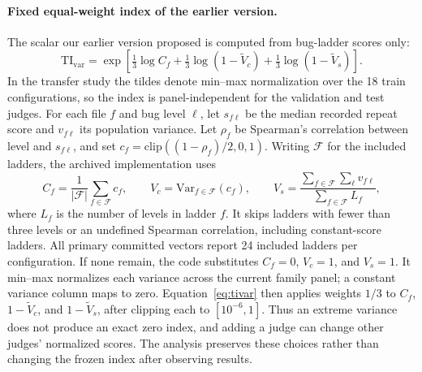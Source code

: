 \paragraph{Fixed equal-weight index of the earlier version.}
The scalar our earlier version proposed is computed from bug-ladder scores only:
\begin{equation}
\mathrm{TI}_{\mathrm{var}}=\exp\!\left[\tfrac13\log C_f+\tfrac13\log(1-\widetilde V_c)+\tfrac13\log(1-\widetilde V_s)\right].
\label{eq:tivar}
\end{equation}
In the transfer study the tildes denote min--max normalization over the 18 train configurations, so the index is panel-independent for the validation and test judges.
For each file $f$ and bug level $\ell$, let $s_{f\ell}$ be the median recorded repeat score and $v_{f\ell}$ its population variance.
Let $\rho_f$ be Spearman's correlation between level and $s_{f\ell}$, and set $c_f=\mathrm{clip}((1-\rho_f)/2,0,1)$.
Writing $\mathcal F$ for the included ladders, the archived implementation uses
\[
 C_f=\frac1{|\mathcal F|}\sum_{f\in\mathcal F}c_f,\qquad
 V_c=\mathrm{Var}_{f\in\mathcal F}(c_f),\qquad
 V_s=\frac{\sum_{f\in\mathcal F}\sum_\ell v_{f\ell}}{\sum_{f\in\mathcal F}L_f},
\]
where $L_f$ is the number of levels in ladder $f$.
It skips ladders with fewer than three levels or an undefined Spearman correlation, including constant-score ladders.
All primary committed vectors report 24 included ladders per configuration.
If none remain, the code substitutes $C_f=0$, $V_c=1$, and $V_s=1$.
It min--max normalizes each variance across the current family panel; a constant variance column maps to zero.
Equation~\ref{eq:tivar} then applies weights $1/3$ to $C_f$, $1-\widetilde V_c$, and $1-\widetilde V_s$, after clipping each to $[10^{-6},1]$.
Thus an extreme variance does not produce an exact zero index, and adding a judge can change other judges' normalized scores.
The analysis preserves these choices rather than changing the frozen index after observing results.

